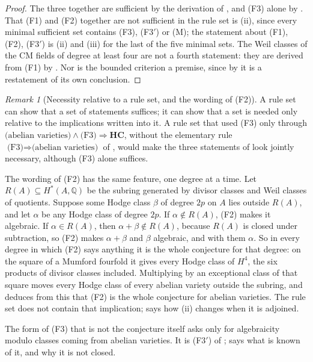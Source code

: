 \documentclass[11pt,reqno]{amsart}
\theoremstyle{plain}
\theoremstyle{definition}
\theoremstyle{remark}
\newtheorem{remark}[theorem]{Remark}
\newcommand{\QQ}{\mathbb{Q}}
\begin{document}
\begin{proof}
The three together are sufficient by the derivation of ,
and (F3) alone by . That (F1) and (F2) together are not
sufficient in the rule set is (ii), since every minimal
sufficient set contains (F3), \textup{(F3$'$)} or \textup{(M)}; the
statement about (F1), (F2), \textup{(F3$'$)} is (ii) and
(iii) for the last of the five minimal sets. The Weil classes of the CM
fields of degree at least four are not a fourth statement: they are derived
from (F1) by \cite[Theorem~17.7]{paperI}. Nor is the bounded criterion a
premise, since by \cite[Theorem~16.17]{paperI} it is a restatement of its own
conclusion.
\end{proof}

\begin{remark}[Necessity relative to a rule set, and the wording of (F2)]
\label{rem:f3collapse}
A rule set can show that a set of statements suffices; it can show that a set
is needed only relative to the implications written into it. A rule set that
used (F3) only through $\text{(abelian varieties)}\wedge
\text{(F3)}\Rightarrow\mathbf{HC}$, without the elementary rule
$\text{(F3)}\Rightarrow\text{(abelian varieties)}$ of ,
would make the three statements of  look jointly
necessary, although (F3) alone suffices.

The wording of (F2) has the same feature, one degree at a time. Let
$R(A)\subseteq H^{*}(A,\QQ)$ be the subring generated by divisor classes and
Weil classes of quotients. Suppose some Hodge class $\beta$ of degree $2p$ on
$A$ lies outside $R(A)$, and let $\alpha$ be any Hodge class of degree $2p$.
If $\alpha\notin R(A)$, (F2) makes it algebraic. If $\alpha\in R(A)$, then
$\alpha+\beta\notin R(A)$, because $R(A)$ is closed under subtraction, so
(F2) makes $\alpha+\beta$ and $\beta$ algebraic, and with them $\alpha$.
So in every degree in which (F2) says anything it is the whole conjecture for
that degree: on the square of a Mumford fourfold it gives every Hodge class of
$H^{4}$, the six products of divisor classes included. Multiplying by an
exceptional class of that square moves every Hodge class of every abelian
variety outside the subring, and  deduces from this that
(F2) is the whole conjecture for abelian varieties. The rule set does not
contain that implication;  says how (ii)
changes when it is adjoined.

The form of (F3) that is not the conjecture itself asks only for
algebraicity modulo classes coming from abelian varieties. It is
\textup{(F3$'$)} of ;  says what is
known of it, and  why it is not closed.
\end{remark}
\end{document}
